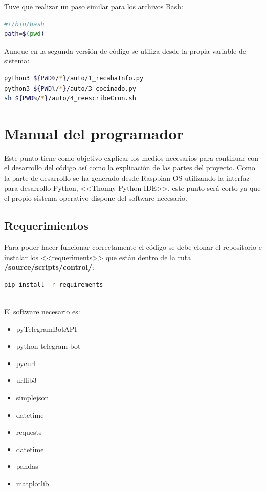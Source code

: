 Tuve que realizar un paso similar para los archivos Bash:
\begin{lstlisting}[language=sh, firstnumber=0, basicstyle=\small, caption={Obtención de rutas en Bash scripting.}]
#!/bin/bash
path=$(pwd)
\end{lstlisting}
Aunque en la segunda versión de código se utiliza desde la propia variable de sistema:

\begin{lstlisting}[language=sh, firstnumber=0, basicstyle=\small, caption={Utilización de las variables de sistema en Bash.}]
python3 ${PWD%/*}/auto/1_recabaInfo.py
python3 ${PWD%/*}/auto/3_cocinado.py
sh ${PWD%/*}/auto/4_reescribeCron.sh
\end{lstlisting}

\section{Manual del programador}
Este punto tiene como objetivo explicar los medios necesarios para continuar con el desarrollo del código así como la explicación de las partes del proyecto.
Como la parte de desarrollo se ha generado desde Raspbian OS utilizando la interfaz para desarrollo Python, <<Thonny Python IDE>>, este punto será corto ya que el propio sistema operativo dispone del software necesario.

\subsection{Requerimientos}
Para poder hacer funcionar correctamente el código se debe clonar el repositorio e instalar los <<requeriments>> que están dentro de la ruta \textbf{/source/scripts/control/}:
\begin{lstlisting}[language=sh, firstnumber=0, basicstyle=\normalsize, caption={Comando para instalar las librerías neceasrias.}]
pip install -r requirements
\end{lstlisting}~\\

El software necesario es:
\begin{itemize}
    \item pyTelegramBotAPI
    \item python-telegram-bot
    \item pycurl
    \item urllib3
    \item simplejson
    \item datetime
    \item requests
    \item datetime
    \item pandas
    \item matplotlib
\end{itemize}

